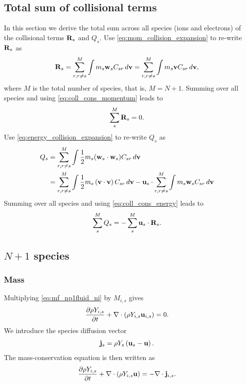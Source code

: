\documentclass[a4paper,11pt]{report}
\begin{document}
\subsection{Total sum of collisional terms}
In this section we derive the total sum across all species (ions and electrons) of the collisional terms $\mathbf{R}_s$ and $Q_s$. Use \cref{eq:mom_collision_expansion} to re-write $\mathbf{R}_s$ as
\begin{equation*}
    \mathbf{R}_s = \sum_{r,r \ne s}^M \int m_s \mathbf{w}_s C_{s r} \, d\mathbf{v} = \sum^M_{r,r \ne s} \int m_s \mathbf{v} C_{s r} \, d\mathbf{v},
\end{equation*}
where $M$ is the total number of species, that is, $M=N+1$. Summing over all species and using \cref{eq:coll_cons_momentum} leads to
\begin{equation}
    \label{eq:sf_sum_mom_collisions}
    \sum_s^M \mathbf{R}_s = 0.
\end{equation}
Use \cref{eq:energy_collision_expansion} to re-write $Q_s$ as
\begin{align*}
    Q_s &= \sum_{r,r \ne s}^M \int \frac{1}{2} m_s (\mathbf{w}_s \cdot \mathbf{w}_s) C_{s r} \, d\mathbf{v} \\
    &= \sum_{r,r \ne s}^M \int \frac{1}{2} m_s \left( \mathbf{v} \cdot \mathbf{v} \right) C_{sr} \, d\mathbf{v} - \mathbf{u}_s \cdot \sum_{r,r \ne s}^M \int m_s \mathbf{w}_s C_{s r} \, d\mathbf{v}
\end{align*}
Summing over all species and using \cref{eq:coll_cons_energy} leads to
\begin{equation}
    \label{eq:sf_sum_energy_collisions}
    \sum_s^M Q_s = - \sum_s^M \mathbf{u}_s \cdot \mathbf{R}_s.
\end{equation}

\subsection{$N+1$ species}
\label{sec:sf_np1_species}

\subsubsection{Mass}

Multiplying \cref{eq:mf_np1fluid_ni} by $M_{i,s}$ gives
\begin{equation*}
    \frac{\partial \rho Y_{i,s}}{\partial t} + \nabla \cdot \left( \rho Y_{i,s} \mathbf{u}_{i,s} \right) = 0.
\end{equation*}
We introduce the species diffusion vector
\begin{equation}
    \label{eq:sf_species_diffusion_vector}
    \mathbf{j}_s = \rho Y_s \left( \mathbf{u}_s - \mathbf{u} \right).
\end{equation}
The mass-conservation equation is then written as
\begin{equation}
    \frac{\partial \rho Y_{i,s}}{\partial t} + \nabla \cdot \left( \rho Y_{i,s} \mathbf{u} \right) = -\nabla \cdot \mathbf{j}_{i,s}.
\end{equation}
\end{document}
